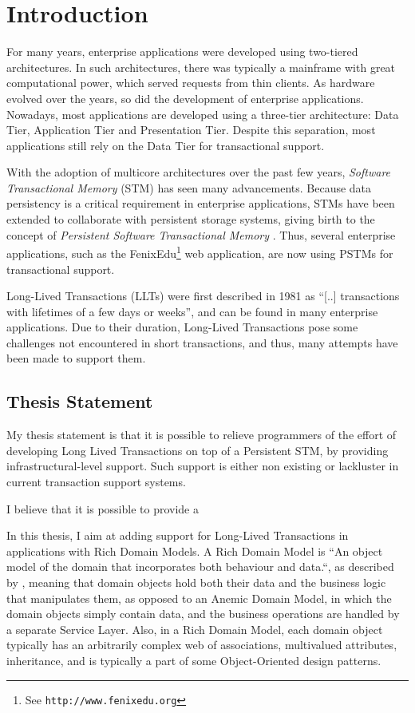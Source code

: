 \chapter{Introduction}

For many years, enterprise applications were developed using
two-tiered architectures. In such architectures, there was typically a
mainframe with great computational power, which served requests from
thin clients. As hardware evolved over the years, so did the
development of enterprise applications. Nowadays, most applications
are developed using a three-tier architecture: Data Tier, Application
Tier and Presentation Tier. Despite this separation, most applications
still rely on the Data Tier for transactional support.

With the adoption of multicore architectures over the past few years,
{\it Software Transactional Memory} (STM) has seen many advancements.
Because data persistency is a critical requirement in enterprise
applications, STMs have been extended to collaborate with persistent
storage systems, giving birth to the concept of {\it Persistent
  Software Transactional Memory} \cite{fernandes2011strict}. Thus,
several enterprise applications, such as the FenixEdu\footnote{See
  \texttt{http://www.fenixedu.org}} web application, are now using
PSTMs for transactional support.

Long-Lived Transactions (LLTs) were first described in 1981 as ``[..]
transactions with lifetimes of a few days or
weeks''\cite{gray1981transaction}, and can be found in many enterprise
applications. Due to their duration, Long-Lived Transactions pose some
challenges not encountered in short transactions, and thus, many
attempts have been made to support them.

\section{Thesis Statement}

My thesis statement is that it is possible to relieve programmers of
the effort of developing Long Lived Transactions on top of a
Persistent STM, by providing infrastructural-level support. Such
support is either non existing or lackluster in current transaction
support systems.

I believe that it is possible to provide a 

In this thesis, I aim at adding support for Long-Lived Transactions in
applications with Rich Domain Models.  A Rich Domain Model is ``An
object model of the domain that incorporates both behaviour and
data.``, as described by \cite{fowler2003patterns}, meaning that
domain objects hold both their data and the business logic that
manipulates them, as opposed to an Anemic Domain Model, in which the
domain objects simply contain data, and the business operations are
handled by a separate Service Layer. Also, in a Rich Domain Model,
each domain object typically has an arbitrarily complex web of
associations, multivalued attributes, inheritance, and is typically a
part of some Object-Oriented design patterns.

